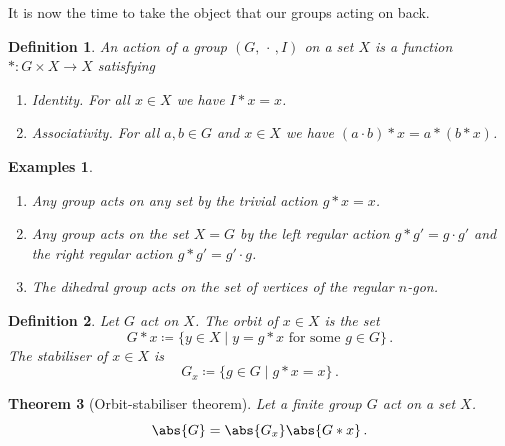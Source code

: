 \documentclass{article}
\theoremstyle{plain}\theoremheaderfont{\normalfont\itshape}\theorembodyfont{\rmfamily}\theoremseparator{.}\newtheorem*{rem}{Remark}\newtheorem*{ex}{Example}\newtheorem*{proof}{Proof}\newtheorem*{altp}{Alternative proof}
\theoremstyle{plain}\theoremheaderfont{\normalfont\bfseries}\theorembodyfont{\rmfamily}\theoremseparator{.}\newtheorem{thm}{Theorem}[section]\newtheorem{lem}[thm]{Lemma}\newtheorem{prop}[thm]{Proposition}\newtheorem*{cor}{Corollary}\newtheorem{defn}[thm]{Definition}\newtheorem{clm}[thm]{Claim}\newtheorem{clminproof}{Claim}
\theoremstyle{break}\theoremheaderfont{\normalfont\itshape}\theorembodyfont{\rmfamily}\theoremseparator{.\medskip}\newtheorem*{proofskip}{Proof}\newtheorem*{exs}{Examples}\newtheorem*{rems}{Remarks}
\theoremstyle{break}\theoremheaderfont{\normalfont\bfseries}\theorembodyfont{\rmfamily}\theoremseparator{.\medskip}\newtheorem{lemskip}[thm]{Lemma}\newtheorem{defnskip}[thm]{Definition}\newtheorem{propskip}[thm]{Proposition}\newtheorem{thmskip}[thm]{Theorem}
\numberwithin{equation}{section}
\begin{document}
	It is now the time to take the object that our groups acting on back.

	\begin{defn}
		An action of a group \((G,\,\cdot\,, I)\) on a set \(X\) is a function \( * : G\times X \to X\) satisfying
		\begin{enumerate}[topsep=0pt]
			\item[(A1)] \textit{Identity.} For all \(x \in X\) we have \(I*x=x\).
			\item[(A2)] \textit{Associativity.} For all \(a,b\in G\) and \(x\in X\) we have \((a\cdot b)*x=a*(b*x)\).
		\end{enumerate}
	\end{defn}
	\begin{exs}
		\begin{enumerate}[topsep=0pt,label=(\roman*)]
			\item Any group acts on any set by the \textit{trivial action} \(g*x=x\).
			\item Any group acts on the set \(X=G\) by the \textit{left regular action} \(g*g'=g\cdot g'\) and the \textit{right regular action} \(g*g'=g'\cdot g\).
			\item The dihedral group acts on the set of vertices of the regular \(n\)-gon.
		\end{enumerate}
	\end{exs}
	\begin{defn}
		Let \(G\) act on \(X\). The \textit{orbit} of \(x\in X\) is the set
		\[G*x\coloneqq \{y\in X\mid y=g*x\text{ for some }g\in G\}\,.\]
		The \textit{stabiliser} of \(x\in X\) is
		\[G_x\coloneqq\{g\in G\mid g*x=x\}\,.\]
	\end{defn}
	\begin{thm}[Orbit-stabiliser theorem]
		Let a finite group \(G\) act on a set \(X\).
		\[\abs{G}=\abs{G_x}\abs{G*x}\,.\]	
	\end{thm}
\end{document}
